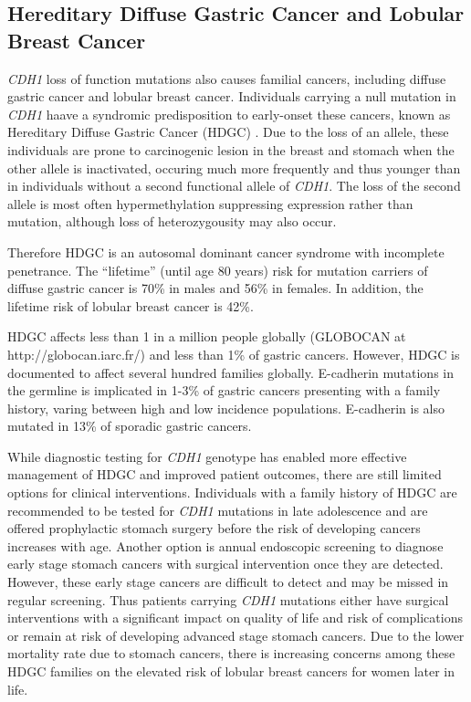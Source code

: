 \subsection{Hereditary Diffuse Gastric Cancer and Lobular Breast Cancer}
\textit{CDH1} loss of function mutations also causes familial cancers, including diffuse gastric cancer and lobular breast cancer\cite{HDGC,Graziano2003,Guilford2010,Oliveira2009}. Individuals carrying a null mutation in \textit{CDH1} haave a syndromic predisposition to early-onset these cancers, known as Hereditary Diffuse Gastric Cancer (HDGC) \cite{Guilford1998}. Due to the loss of an allele, these individuals are prone to carcinogenic lesion in the breast and stomach when the other allele is inactivated, occuring much more frequently and thus younger than in individuals without a second functional allele of \textit{CDH1}. The loss of the second allele is most often hypermethylation suppressing expression rather than mutation, although loss of heterozygousity may also occur. 

Therefore HDGC is an autosomal dominant cancer syndrome with incomplete penetrance. The ``lifetime'' (until age 80 years) risk for mutation carriers  of diffuse gastric cancer is 70\% in males and 56\% in females. In addition, the lifetime risk of lobular breast cancer is 42\%.   

HDGC affects less than 1 in a million people globally (GLOBOCAN at http://globocan.iarc.fr/) and less than 1\% of gastric cancers. However, HDGC is documented to affect several hundred families globally. E-cadherin mutations in the germline is implicated in 1-3\% of gastric cancers presenting with a family history, varing between high and low incidence populations. E-cadherin is also mutated in 13\% of sporadic gastric cancers.

While diagnostic testing for \textit{CDH1} genotype has enabled more effective management of HDGC and improved patient outcomes, there are still limited options for clinical interventions. Individuals with a family history of HDGC are recommended to be tested for \textit{CDH1} mutations in late adolescence and are offered prophylactic stomach surgery before the risk of developing cancers increases with age. Another option is annual endoscopic screening to diagnose early stage stomach cancers with surgical intervention once they are detected. However, these early stage cancers are difficult to detect and may be missed in regular screening. Thus patients carrying \textit{CDH1} mutations either have surgical interventions with a significant impact on quality of life and risk of complications or remain at risk of developing advanced stage stomach cancers. Due to the lower mortality rate due to stomach cancers, there is increasing concerns among these HDGC families on the elevated risk of lobular breast cancers for women later in life.

